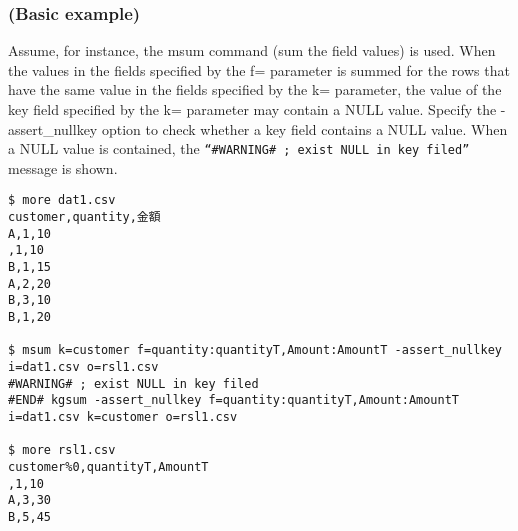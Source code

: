 \subsubsection*{(Basic example) }
Assume, for instance, the msum command (sum the field values) is used. When the values in the fields specified by the f= parameter is summed for the rows that have the same value in the fields specified by the k= parameter, the value of the key field specified by the k= parameter may contain a NULL value. Specify the -assert\_nullkey option to check whether a key field contains a NULL value. When a NULL value is contained, the \verb|“#WARNING# ; exist NULL in key filed”| message is shown.

\begin{Verbatim}[baselinestretch=0.7,frame=single]
$ more dat1.csv
customer,quantity,金額
A,1,10
,1,10
B,1,15
A,2,20
B,3,10
B,1,20

$ msum k=customer f=quantity:quantityT,Amount:AmountT -assert_nullkey i=dat1.csv o=rsl1.csv
#WARNING# ; exist NULL in key filed
#END# kgsum -assert_nullkey f=quantity:quantityT,Amount:AmountT i=dat1.csv k=customer o=rsl1.csv

$ more rsl1.csv
customer%0,quantityT,AmountT
,1,10
A,3,30
B,5,45
\end{Verbatim}
